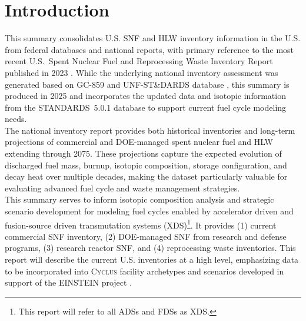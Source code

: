 \section{Introduction}
    This summary consolidates U.S. \gls{SNF} and \gls{HLW}
    inventory information in the U.S. from federal databases
    and national reports, with primary reference to the most recent U.S.\ Spent Nuclear Fuel
    and Reprocessing Waste Inventory Report published in 2023 \cite{carter_spent_2023}. While the underlying national inventory assessment
    was generated based on GC-859 \cite{GC-859} and UNF-ST\&DARDS database \cite{banerjee_unf-st&dards:_2016}, this summary is
    produced in 2025 and incorporates the updated data and isotopic information from the STANDARDS~5.0.1 database
    to support current fuel cycle modeling needs.\\

    The national inventory report provides both historical inventories and long-term projections of commercial and \gls{DOE}-managed
    spent nuclear fuel and \gls{HLW} extending through 2075. These projections capture the expected evolution of discharged
    fuel mass, burnup, isotopic composition, storage configuration, and decay heat over multiple decades, making the dataset particularly
    valuable for evaluating advanced fuel cycle and waste management strategies.\\

    This summary serves to inform isotopic 
    composition analysis and strategic scenario development for modeling 
    fuel cycles enabled by accelerator driven and fusion-source driven 
    transmutation systems (XDS)\footnote{This report will refer to all \glspl{ADS} and 
    \glspl{FDS} as \gls{XDS}.}.  It provides (1) current commercial \gls{SNF} inventory, 
    (2) \gls{DOE}-managed \gls{SNF} from research and defense programs, (3) research 
    reactor \gls{SNF}, and (4) reprocessing waste inventories.
    This report will describe the current U.S. inventories at a high level, emphasizing 
    data to be incorporated into \textsc{Cyclus} \cite{huff_fundamental_2016} 
    facility archetypes and scenarios developed in support of the 
    \gls{EINSTEIN} project \cite{fang_einstein_2025}.


